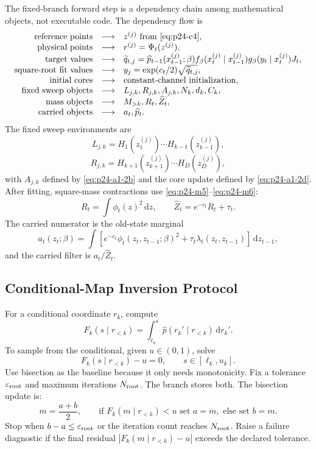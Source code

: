 \documentclass[11pt]{article}
\numberwithin{equation}{section}
\newcommand{\dd}{\,\mathrm d}
\begin{document}
The fixed-branch forward step is a dependency chain among mathematical
objects, not executable code.  The dependency flow is
\begin{equation}
\begin{array}{rcl}
\text{reference points} &\longrightarrow& z^{(j)} \text{ from \eqref{eq:p24-c4}},\\
\text{physical points} &\longrightarrow& r^{(j)}=\Psi_t(z^{(j)}),\\
\text{target values} &\longrightarrow&
    \widetilde q_{t,j}
    =
    \widehat p_{t-1}(x_{t-1}^{(j)};\beta)
    f_\beta(x_t^{(j)}\mid x_{t-1}^{(j)})
    g_\beta(y_t\mid x_t^{(j)})J_t,\\
\text{square-root fit values} &\longrightarrow&
    y_j=\exp(c_t/2)\sqrt{\widetilde q_{t,j}},\\
\text{initial cores} &\longrightarrow&
    \text{constant-channel initialization},\\
\text{fixed sweep objects} &\longrightarrow&
    L_{j,k},R_{j,k},A_{j,k},N_k,d_k,C_k,\\
\text{mass objects} &\longrightarrow&
    M_{>k},R_t,\widehat Z_t,\\
\text{carried objects} &\longrightarrow&
    a_t,\widehat p_t.
\end{array}
\label{eq:p24-c12}
\end{equation}
The fixed sweep environments are
\[
    L_{j,k}=H_1(z_1^{(j)})\cdots H_{k-1}(z_{k-1}^{(j)}),
\]
\[
    R_{j,k}=H_{k+1}(z_{k+1}^{(j)})\cdots H_D(z_D^{(j)}),
\]
with \(A_{j,k}\) defined by \eqref{eq:p24-a1-2b} and the core update defined by \eqref{eq:p24-a1-2d}.
After fitting, square-mass contractions use \eqref{eq:p24-m5}--\eqref{eq:p24-m6}:
\[
    R_t=\int\phi_t(z)^2\dd z,\qquad
    \widehat Z_t=e^{-c_t}R_t+\tau_t.
\]
The carried numerator is the old-state marginal
\[
    a_t(z_t;\beta)
    =
    \int
    \left[e^{-c_t}\phi_t(z_t,z_{t-1};\beta)^2
    +\tau_t\lambda_t(z_t,z_{t-1})\right]\dd z_{t-1},
\]
and the carried filter is \(a_t/\widehat Z_t\).

\subsection{Conditional-Map Inversion Protocol}

For a conditional coordinate \(r_k\), compute
\[
    F_k(s\mid r_{<k})
    =
    \int_{\ell_k}^{s}\widehat p(r_k'\mid r_{<k})\dd r_k'.
\]
To sample from the conditional, given \(u\in(0,1)\), solve
\[
    F_k(s\mid r_{<k})-u=0,\qquad s\in[\ell_k,u_k].
\]
Use bisection as the baseline because it only needs monotonicity.  Fix a
tolerance \(\varepsilon_{\rm root}\) and maximum iterations \(N_{\rm root}\).
The branch stores both.  The bisection update is:
\[
    m=\frac{a+b}{2},\qquad
    \text{if }F_k(m\mid r_{<k})<u\text{ set }a=m,\text{ else set }b=m.
\]
Stop when \(b-a\le\varepsilon_{\rm root}\) or the iteration count reaches
\(N_{\rm root}\).  Raise a failure diagnostic if the final residual
\(|F_k(m\mid r_{<k})-u|\) exceeds the declared tolerance.
\end{document}
